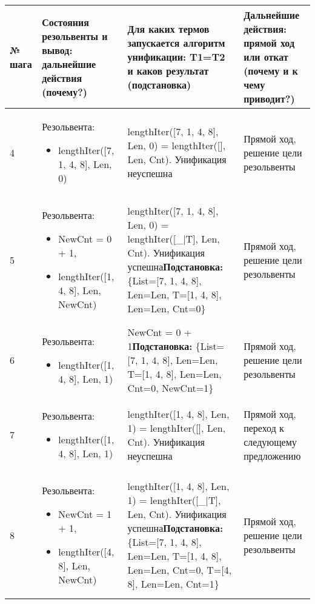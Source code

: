 \documentclass[14pt,a4paper]{scrreprt}
\begin{document}
\begin{table}[H]
	\begin{tabular}{|p{0.8cm\small}|p{4.7cm\small}|p{5.7cm\small}|p{4cm\small}|}	
		\hline
		№ шага & Состояния резольвенты и вывод: дальнейшие действия (почему?) & Для каких термов запускается алгоритм унификации: T1=T2 и каков результат (подстановка) & Дальнейшие действия: прямой ход или откат (почему и к чему приводит?)\\
		\hline
		4 & Резольвента: \begin{itemize} \item lengthIter([7, 1, 4, 8], Len, 0) \end{itemize} & lengthIter([7, 1, 4, 8], Len, 0) = lengthIter([], Len, Cnt). Унификация неуспешна & Прямой ход, решение цели резольвенты \\
		\hline
		5 & Резольвента: \begin{itemize} \item NewCnt = 0 + 1, \item lengthIter([1, 4, 8], Len, NewCnt) \end{itemize} & lengthIter([7, 1, 4, 8], Len, 0) = lengthIter([\_|T], Len, Cnt). Унификация успешна\linebreak \textbf{Подстановка:} \{List=[7, 1, 4, 8], Len=Len, T=[1, 4, 8], Len=Len, Cnt=0\} & Прямой ход, решение цели резольвенты \\
		\hline
		6 & Резольвента: \begin{itemize} \item lengthIter([1, 4, 8], Len, 1) \end{itemize} & NewCnt = 0 + 1\linebreak \textbf{Подстановка:} \{List=[7, 1, 4, 8], Len=Len, T=[1, 4, 8], Len=Len, Cnt=0, NewCnt=1\} & Прямой ход, решение цели резольвенты\\
		\hline
		7 & Резольвента: \begin{itemize} \item lengthIter([1, 4, 8], Len, 1) \end{itemize} & lengthIter([1, 4, 8], Len, 1) = lengthIter([], Len, Cnt). Унификация неуспешна & Прямой ход, переход к следующему предложению\\
		\hline
		8 & Резольвента: \begin{itemize} \item NewCnt = 1 + 1, \item lengthIter([4, 8], Len, NewCnt) \end{itemize} & lengthIter([1, 4, 8], Len, 1) = lengthIter([\_|T], Len, Cnt). Унификация успешна\linebreak \textbf{Подстановка:} \{List=[7, 1, 4, 8], Len=Len, T=[1, 4, 8], Len=Len, Cnt=0, T=[4, 8], Len=Len, Cnt=1\} & Прямой ход, решение цели резольвенты \\

\end{tabular}
\end{table}
\end{document}
